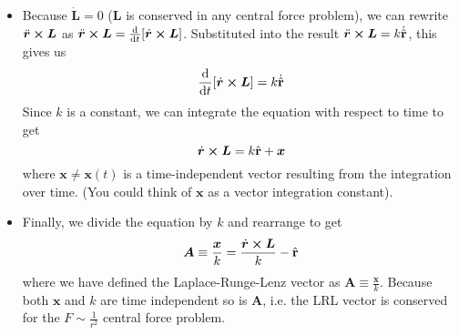 \documentclass[11pt, a4paper]{article}
\newcommand{\uvec}[1]{\hat{\mathbf{#1}}}
\newcommand{\bdot}[1]{\dot{\bm{#1}}}
\newcommand{\bddot}[1]{\ddot{\bm{#1}}}
\begin{document}
\begin{itemize}
	\item Because $ \bdot{L} = 0 $ ($ \bm{L} $ is conserved in any central force problem), we can rewrite $ \bddot{r}\cross \bm{L} $ as $ \bddot{r}\cross \bm{L} = \dv{}{t}[\bdot{r}\cross \bm{L}] $. Substituted into the result $ \bddot{r}\cross \bm{L} = k \dot{\uvec{r}} $, this gives us
	\begin{equation*}
		\dv{}{t}[\bdot{r}\cross \bm{L}] = k \dot{\uvec{r}}
	\end{equation*}
	Since $ k $ is a constant, we can integrate the equation with respect to time to get
	\begin{equation*}
		\bdot{r} \cross \bm{L} = k \uvec{r} + \bm{x}
	\end{equation*}
	where $ \bm{x} \neq \bm{x}(t) $ is a time-independent vector resulting from the integration over time. (You could think of $ \bm{x} $ as a vector integration constant).
	
	\item Finally, we divide the equation by $ k $ and rearrange to get
	\begin{equation*}
		\bm{A} \equiv \frac{\bm{x}}{k} =  \frac{\bdot{r} \cross \bm{L}}{k} - \uvec{r} 
	\end{equation*}
	where we have defined the Laplace-Runge-Lenz vector as $ \bm{A} \equiv \frac{\bm{x}}{k} $. Because both $ \bm{x} $ and $ k $ are time independent so is $ \bm{A} $, i.e. the LRL vector is conserved for the $ F \sim \frac{1}{r^{2}} $ central force problem.
	
\end{itemize}
\end{document}
